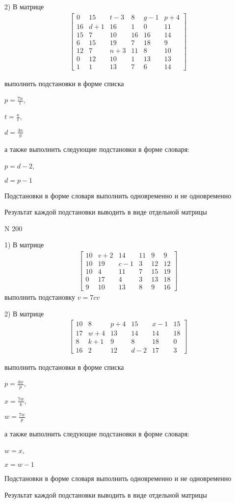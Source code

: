 \documentclass[11pt]{report}
\begin{document}
    2) В матрице
\begin{align*}
\left[\begin{matrix}0 & 15 & t - 3 & 8 & g - 1 & p + 4\\16 & d + 1 & 16 & 1 & 0 & 11\\15 & 7 & 10 & 16 & 16 & 14\\6 & 15 & 19 & 7 & 18 & 9\\12 & 7 & n + 3 & 11 & 8 & 10\\0 & 12 & 10 & 1 & 13 & 13\\1 & 1 & 13 & 7 & 6 & 14\end{matrix}\right]
\end{align*}

выполнить подстановки в форме списка

$p=\frac{7 n}{t}$,

$t=\frac{n}{t}$,

$d=\frac{4 n}{g}$

а также выполнить следующие подстановки в форме словаря:

$p=d - 2$,

$d=p - 1$


    Подстановки в форме словаря выполнить одновременно и не одновременно


    Результат каждой подстановки выводить в виде отдельной матрицы

\newpage
N 200


    1) В матрице
\begin{align*}
\left[\begin{matrix}10 & v + 2 & 14 & 11 & 9 & 9\\10 & 19 & c - 1 & 3 & 12 & 12\\10 & 4 & 11 & 7 & 15 & 19\\0 & 17 & 4 & 3 & 13 & 18\\9 & 10 & 13 & 8 & 9 & 16\end{matrix}\right]
\end{align*}
выполнить подстановку $v=7 c v$


    2) В матрице
\begin{align*}
\left[\begin{matrix}10 & 8 & p + 4 & 15 & x - 1 & 15\\17 & w + 4 & 13 & 14 & 14 & 18\\8 & k + 1 & 9 & 8 & 18 & 0\\16 & 2 & 12 & d - 2 & 17 & 3\end{matrix}\right]
\end{align*}

выполнить подстановки в форме списка

$p=\frac{4 w}{p}$,

$x=\frac{7 w}{k}$,

$w=\frac{7 w}{p}$

а также выполнить следующие подстановки в форме словаря:

$w=x$,

$x=w - 1$


    Подстановки в форме словаря выполнить одновременно и не одновременно


    Результат каждой подстановки выводить в виде отдельной матрицы

\newpage
\end{document}
